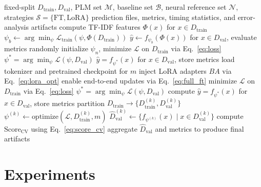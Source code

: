 \documentclass[conference, onecolumn]{IEEEtran}
\begin{document}
\begin{algorithm}[!htbp]
\caption{Unified training and evaluation pipeline for Lao sentiment classification}
\label{alg:benchmark_pipeline}
\small
\begin{algorithmic}[1]
\Require fixed-split $D_{\text{train}}, D_{\text{val}}$, PLM set $\mathcal{M}$, baseline set $\mathcal{B}$, neural reference set $\mathcal{N}$, strategies $\mathcal{S}=\{\text{FT},\text{LoRA}\}$
\Ensure prediction files, metrics, timing statistics, and error-analysis artifacts
 
    \State compute TF-IDF features $\Phi(x)$ for $x \in D_{\text{train}}$
    \State $\psi_b \leftarrow \arg\min_{\psi} \mathcal{L}_{\text{train}}(\psi, \Phi(D_{\text{train}}))$
    \State $\hat{y} \leftarrow f_{\psi_b}(\Phi(x))$ for $x \in D_{\text{val}}$, evaluate metrics
\EndFor
{} 
    \State randomly initialize $\psi_n$, minimize $\mathcal{L}$ on $D_{\text{train}}$ via Eq.~\eqref{eq:loss}
    \State $\psi^* = \arg\min_{\psi} \mathcal{L}(\psi, D_{\text{val}})$
    \State $\hat{y} = f_{\psi^*}(x)$ for $x \in D_{\text{val}}$, store metrics
\EndFor
{} 
        \State load tokenizer and pretrained checkpoint for $m$
            \State inject LoRA adapters $BA$ via Eq.~\eqref{eq:lora_opt}
        \Else
            \State enable end-to-end updates via Eq.~\eqref{eq:full_ft}
        \EndIf
        \State minimize $\mathcal{L}$ on $D_{\text{train}}$ via Eq.~\eqref{eq:loss}
        \State $\psi^* = \arg\min_{\psi} \mathcal{L}(\psi, D_{\text{val}})$
        \State compute $\hat{y} = f_{\psi^*}(x)$ for $x \in D_{\text{val}}$, store metrics
    \EndFor
        \State partition $D_{\text{train}} \rightarrow \{ D_{\text{train}}^{(k)}, D_{\text{val}}^{(k)} \}$
        \State $\psi^{(k)} \leftarrow \text{optimize}(\mathcal{L}, D_{\text{train}}^{(k)}, m)$
        \State $\hat{D}_{\text{val}}^{(k)} \leftarrow \{f_{\psi^{(k)}}(x) \mid x \in D_{\text{val}}^{(k)}\}$
    \EndFor
    \State compute $\text{Score}_{\text{CV}}$ using Eq.~\eqref{eq:score_cv}
\EndFor
\State aggregate $\hat{D}_{\text{val}}$ and metrics to produce final artifacts
\end{algorithmic}
\end{algorithm}


\section{Experiments}
\label{sec:experiments}
\end{document}
